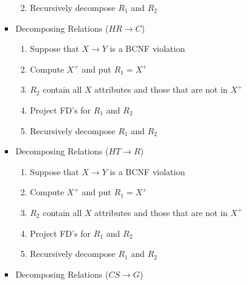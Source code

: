 \documentclass[12pt]{article}
\begin{document}
\begin{enumerate}[1.]
\begin{enumerate}[a)]
\begin{itemize}
\begin{enumerate}[1.]
\begin{itemize}
                \end{itemize}

                \bigskip

                \item Recursively decompose $R_1$ and $R_2$

            \end{enumerate}

            \item Decomposing Relations ($HR \to C$)

            \begin{enumerate}[1.]
                \item Suppose that $X \to Y$ is a BCNF violation

                \item Compute $X^+$ and put $R_1 = X^+$

                \item $R_2$ contain all $X$ attributes and those that are not in $X^+$

                \item Project FD's for $R_1$ and $R_2$

                \item Recursively decompose $R_1$ and $R_2$

            \end{enumerate}

            \item Decomposing Relations ($HT \to R$)

            \begin{enumerate}[1.]
                \item Suppose that $X \to Y$ is a BCNF violation

                \item Compute $X^+$ and put $R_1 = X^+$

                \item $R_2$ contain all $X$ attributes and those that are not in $X^+$

                \item Project FD's for $R_1$ and $R_2$

                \item Recursively decompose $R_1$ and $R_2$

            \end{enumerate}

            \item Decomposing Relations ($CS \to G$)


\end{itemize}
\end{enumerate}
\end{enumerate}
\end{document}

